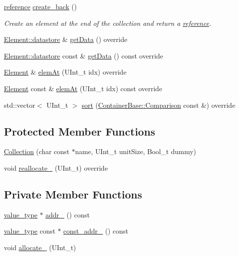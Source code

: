 \begin{DoxyCompactItemize}
\hyperlink{classpanda_1_1Collection_a908a535fcc02ad985ac9eb974f02546f}{reference} \hyperlink{classpanda_1_1Collection_a76d29ff9b6366c3a39f2aa06ac6b0604}{create\_\-back} ()
\begin{DoxyCompactList}\small\item\em Create an element at the end of the collection and return a \hyperlink{namespacepanda_1_1reference}{reference}. \item\end{DoxyCompactList}\item 
\hyperlink{structpanda_1_1Element_1_1datastore}{Element::datastore} \& \hyperlink{classpanda_1_1Collection_a262ac9c1180f647b0140e53fe0e5d5d6}{getData} () override
\item 
\hyperlink{structpanda_1_1Element_1_1datastore}{Element::datastore} const \& \hyperlink{classpanda_1_1Collection_ab27df679acedc97ee31d230dd630cccf}{getData} () const override
\item 
\hyperlink{classpanda_1_1Element}{Element} \& \hyperlink{classpanda_1_1Collection_add5ee7e7d1969880a3f00de700425d67}{elemAt} (UInt\_\-t idx) override
\item 
\hyperlink{classpanda_1_1Element}{Element} const \& \hyperlink{classpanda_1_1Collection_a2d634c66148b760ddd2779ff559d6511}{elemAt} (UInt\_\-t idx) const override
\item 
std::vector$<$ UInt\_\-t $>$ \hyperlink{classpanda_1_1Collection_a10c98d854734dc7d8063eca3ca6e01ad}{sort} (\hyperlink{classpanda_1_1ContainerBase_a5269fda4f420b52d6ed9c0dac548559e}{ContainerBase::Comparison} const \&) override
\end{DoxyCompactItemize}
\subsection*{Protected Member Functions}
\begin{DoxyCompactItemize}
\item 
\hyperlink{classpanda_1_1Collection_aba5674236155e6763257004ca1fa1a26}{Collection} (char const $\ast$name, UInt\_\-t unitSize, Bool\_\-t dummy)
\item 
void \hyperlink{classpanda_1_1Collection_a2187bdc5efe30684f1e9f4db4fe4fb2e}{reallocate\_\-} (UInt\_\-t) override
\end{DoxyCompactItemize}
\subsection*{Private Member Functions}
\begin{DoxyCompactItemize}
\item 
\hyperlink{classpanda_1_1Collection_a9df859281619e6213192b6f7af902d76}{value\_\-type} $\ast$ \hyperlink{classpanda_1_1Collection_a24157825ebc9add7825e51ba47f1bd97}{addr\_\-} () const 
\item 
\hyperlink{classpanda_1_1Collection_a9df859281619e6213192b6f7af902d76}{value\_\-type} const $\ast$ \hyperlink{classpanda_1_1Collection_a15e865455a9275efe83ca65f1a96b3e9}{const\_\-addr\_\-} () const 
\item 
void \hyperlink{classpanda_1_1Collection_af6d52087e85607c91a6bd6400185442a}{allocate\_\-} (UInt\_\-t)
\end{DoxyCompactItemize}
